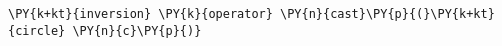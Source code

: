 \begin{Verbatim}[commandchars=\\\{\}]
    \PY{k+kt}{inversion} \PY{k}{operator} \PY{n}{cast}\PY{p}{(}\PY{k+kt}{circle} \PY{n}{c}\PY{p}{)}
\end{Verbatim}
